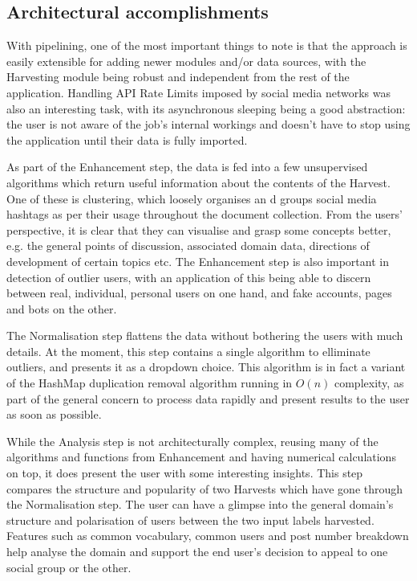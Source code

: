 \documentclass[12pt,a4paper,twoside]{report}
\begin{document}
\subsection{Architectural accomplishments}
With pipelining, one of the most important things to note is that the approach is easily extensible for adding newer modules and/or data sources, with the Harvesting module being robust and independent from the rest of the application. Handling API Rate Limits imposed by social media networks was also an interesting task, with its asynchronous sleeping being a good abstraction: the user is not aware of the job's internal workings and doesn't have to stop using the application until their data is fully imported.

As part of the Enhancement step, the data is fed into a few unsupervised algorithms which return useful information about the contents of the Harvest. One of these is clustering, which loosely organises an d groups social media hashtags as per their usage throughout the document collection. From the users' perspective, it is clear that they can visualise and grasp some concepts better, e.g. the general points of discussion, associated domain data, directions of development of certain topics etc. The Enhancement step is also important in detection of outlier users, with an application of this being able to discern between real, individual, personal users on one hand, and fake accounts, pages and bots on the other.

The Normalisation step flattens the data without bothering the users with much details. At the moment, this step contains a single algorithm to elliminate outliers, and presents it as a dropdown choice. This algorithm is in fact a variant of the HashMap duplication removal algorithm running in $O(n)$ complexity, as part of the general concern to process data rapidly and present results to the user as soon as possible.

While the Analysis step is not architecturally complex, reusing many of the algorithms and functions from Enhancement and having numerical calculations on top, it does present the user with some interesting insights. This step compares the structure and popularity of two Harvests which have gone through the Normalisation step. The user can have a glimpse into the general domain's structure and polarisation of users between the two input labels harvested. Features such as common vocabulary, common users and post number breakdown help analyse the domain and support the end user's decision to appeal to one social group or the other.
\end{document}
